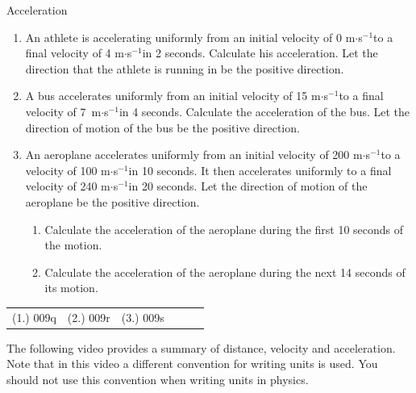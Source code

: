 \label{m38794*secfhsst!!!underscore!!!id1815}
\begin{exercises}{Acceleration }
            \nopagebreak \noindent
      \label{m38794*id62523}\begin{enumerate}[noitemsep, label=\textbf{\arabic*}. ] 
            \label{m38794*uid78}\item An athlete is accelerating uniformly from an initial velocity of 0 m$\ensuremath{\cdot}$s${}^{-1}$to a final velocity of 4 m$\ensuremath{\cdot}$s${}^{-1}$in 2 seconds. Calculate his acceleration. Let the direction that the athlete is running in be the positive direction.
\label{m38794*uid79}\item A bus accelerates uniformly from an initial velocity of 15 m$\ensuremath{\cdot}$s${}^{-1}$to a final velocity of 7~m$\ensuremath{\cdot}$s${}^{-1}$in 4 seconds. Calculate the acceleration of the bus. Let the direction of motion of the bus be the positive direction.
\label{m38794*uid80}\item An aeroplane accelerates uniformly from an initial velocity of 200 m$\ensuremath{\cdot}$s${}^{-1}$to a velocity of 100 m$\ensuremath{\cdot}$s${}^{-1}$in 10 seconds. It then accelerates uniformly to a final velocity of 240 m$\ensuremath{\cdot}$s${}^{-1}$in 20 seconds. Let the direction of motion of the aeroplane be the positive direction.
\label{m38794*id68889}\begin{enumerate}[noitemsep, label=\textbf{\alph*}. ] 
            \label{m38794*uid81}\item Calculate the acceleration of the aeroplane during the first 10 seconds of the motion.
\label{m38794*uid82}\item Calculate the acceleration of the aeroplane during the next 14 seconds of its motion.
\end{enumerate}
                \end{enumerate}
  \label{m38794**end}
\par \practiceinfo
 \par \begin{tabular}[h]{cccccc}
 (1.) 009q  &  (2.) 009r  &  (3.) 009s  & \end{tabular}
\end{exercises}
\label{m38794*eip-307}The following video provides a summary of distance, velocity and acceleration. Note that in this video a different convention for writing units is used. You should not use this convention when writing units in physics.

\nopagebreak
